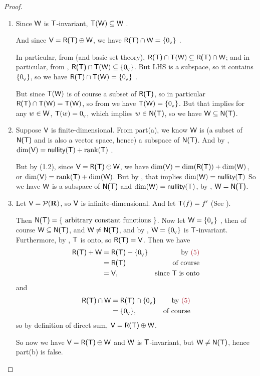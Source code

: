 \begin{proof} \ 
\begin{enumerate}
\item Since \(\textsf{W}\) is \(\textsf{T}\)-invariant, \(\textsf{T}(\textsf{W}) \subseteq \textsf{W}\) .

    And since \(\textsf{V} = \textsf{R(T)} \oplus \textsf{W}\), we have \(\textsf{R(T)}{} \cap \textsf{W} = \{ 0_{_{\textsf{V}}} \}\) .

    In particular, from  (and basic set theory), \(\textsf{R(T)}{} \cap \textsf{T}(\textsf{W}) \subseteq \textsf{R(T)}{} \cap \textsf{W}\);
    and in particular, from \MAROON{(2)}, \(\textsf{R(T)}{} \cap \textsf{T}(\textsf{W}) \subseteq \{ 0_{_{\textsf{V}}} \}\).
    But LHS is a subspace, so it contains \(\{ 0_{_{\textsf{V}}} \}\), so we have \(\textsf{R(T)}{} \cap \textsf{T}(\textsf{W}) = \{ 0_{_{\textsf{V}}} \}\) .

    But since \(\textsf{T}(\textsf{W})\) is of course a subset of \(\textsf{R(T)}\), so in particular \(\textsf{R(T)}{} \cap \textsf{T}(\textsf{W}) = \textsf{T}(\textsf{W})\), so from  we have \(\textsf{T}(\textsf{W}) = \{ 0_{_{\textsf{V}}} \}\).
    But that implies for any \(w \in \textsf{W}\), \(\textsf{T}(w) = 0_{_{\textsf{V}}}\), which implies \(w \in \textsf{N(T)}\), so we have \(\textsf{W} \subseteq \textsf{N(T)}\).

\item Suppose \(\textsf{V}\) is finite-dimensional.
    From part(a), we know \(\textsf{W}\) is (a subset of \(\textsf{N(T)}\) and is also a vector space, hence) a subspace of \(\textsf{N(T)}\).
    And by \THM{2.3}, \(\dim(\textsf{V}) = \textsf{nullity}(\textsf{T}) + \mathrm{rank}(\textsf{T})\) .

    But by (1.2), since \(\textsf{V} = \textsf{R(T)} \oplus \textsf{W}\), we have \(\dim(\textsf{V}) = \dim(\textsf{R(T)}) + \dim(\textsf{W})\), or \(\dim(\textsf{V}) = \mathrm{rank}(\textsf{T}) + \dim(\textsf{W})\).
    But by \MAROON{(4)}, that implies \(\dim(\textsf{W}) = \textsf{nullity}(\textsf{T})\)
    So we have \(\textsf{W}\) is a subspace of \(\textsf{N(T)}\) and \(\dim(\textsf{W}) = \textsf{nullity}(\textsf{T})\), by , \(\textsf{W} = \textsf{N(T)}\).

\item Let \(\textsf{V} = \mathcal{P}(\mathbf{R})\), so \(\textsf{V}\) is infinite-dimensional.
    And let \(\textsf{T}(f) = f'\) (See \EXEC{2.1.16}).

    Then \(\textsf{N(T)} = \{ \text{ arbitrary constant functions } \}\).
    Now let \(\textsf{W} = \{ 0_{_{\textsf{V}}} \}\) \MAROON{(5)}, then of course \(\textsf{W} \subseteq \textsf{N(T)}\), and \(\textsf{W} \ne \textsf{N(T)}\), and by , \(\textsf{W} = \{ 0_{_{\textsf{V}}} \}\) is \(\textsf{T}\)-invariant.
    Furthermore, by \EXEC{2.1.16}, \(\textsf{T}\) is onto, so \(\textsf{R(T)} = \textsf{V}\).
    Then we have
    \begin{align*}
        \RANGET + \W & = \RANGET + \{ \OV \} & \text{by \MAROON{(5)}} \\
                    & = \RANGET & \text{of course} \\
                    & = \V, & \text{since \(\T\) is onto} 
    \end{align*}
    and
    \begin{align*}
        \RANGET \cap \W & = \RANGET \cap \{ \OV \} & \text{by \MAROON{(5)}} \\
                       & = \{ \OV \}, & \text{of course}
    \end{align*}
    so by definition of direct sum, \(\textsf{V} = \textsf{R(T)} \oplus \textsf{W}\).

    So now we have \(\textsf{V} = \textsf{R(T)} \oplus \textsf{W}\) and \(\textsf{W}\) is \(\textsf{T}\)-invariant, but \(\textsf{W} \ne \textsf{N(T)}\), hence part(b) is false.
\end{enumerate}
\end{proof}

